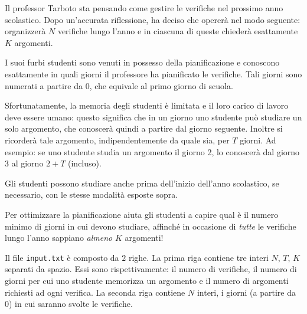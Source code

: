 \usepackage{xcolor}
\usepackage{afterpage}
\usepackage{pifont,mdframed}
\usepackage[bottom,symbol]{footmisc}

\makeatletter
\gdef\this@inputfilename{input.txt}
\gdef\this@outputfilename{output.txt}
\makeatother


\newcommand{\inputfile}{\texttt{input.txt}}
\newcommand{\outputfile}{\texttt{output.txt}}


Il professor Tarboto sta pensando come gestire le verifiche nel prossimo anno scolastico. Dopo un'accurata riflessione, ha deciso che opererà nel modo seguente: organizzerà $N$ verifiche lungo l'anno e in ciascuna di queste chiederà esattamente $K$ argomenti.

I suoi furbi studenti sono venuti in possesso della pianificazione e conoscono esattamente in quali giorni il professore ha pianificato le verifiche. Tali giorni sono numerati a partire da 0, che equivale al primo giorno di scuola.

Sfortunatamente, la memoria degli studenti è limitata e il loro carico di lavoro deve essere umano: questo significa che in un giorno uno studente può studiare un solo argomento, che conoscerà quindi a partire dal giorno seguente. Inoltre si ricorderà tale argomento, indipendentemente da quale sia, per $T$ giorni. Ad esempio: se uno studente studia un argomento il giorno 2, lo conoscerà dal giorno 3 al giorno $2 + T$ (incluso).

Gli studenti possono studiare anche prima dell'inizio dell'anno scolastico, se necessario, con le stesse modalità esposte sopra.

Per ottimizzare la pianificazione aiuta gli studenti a capire qual è il numero minimo di giorni in cui devono studiare, affinché in occasione di \emph{tutte} le verifiche lungo l'anno sappiano \emph{almeno} $K$ argomenti!


\Input
Il file \inputfile{} è composto da $2$ righe. La prima riga contiene tre interi $N$, $T$, $K$ separati da spazio. Essi sono rispettivamente: il numero di verifiche, il numero di giorni per cui uno studente memorizza un argomento e il numero di argomenti richiesti ad ogni verifica.
La seconda riga contiene $N$ interi, i giorni (a partire da 0) in cui saranno svolte le verifiche.

